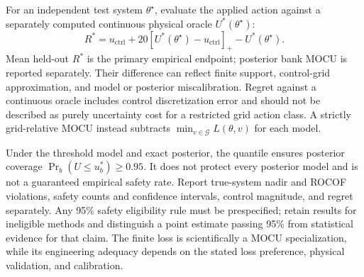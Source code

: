 For an independent test system $\theta^\star$, evaluate the applied action
against a separately computed continuous physical oracle $U^*(\theta^\star)$:
\begin{equation}
R^*=u_{\mathrm{ctrl}}+20[U^*(\theta^\star)-u_{\mathrm{ctrl}}]_+
-U^*(\theta^\star).
\label{eq:realized_regret}
\end{equation}
Mean held-out $R^*$ is the primary empirical endpoint; posterior bank MOCU
is reported separately. Their difference can reflect finite support,
control-grid approximation, and model or posterior miscalibration. Regret
against a continuous oracle includes control discretization error and should
not be described as purely uncertainty cost for a restricted grid action
class. A strictly grid-relative MOCU instead subtracts
$\min_{v\in\mathcal G}L(\theta,v)$ for each model.

Under the threshold model and exact posterior, the quantile ensures posterior
coverage $\Pr_b(U\le u_b^*)\ge0.95$. It does not protect every posterior
model and is not a guaranteed empirical safety rate. Report true-system
nadir and ROCOF violations, safety counts and confidence intervals, control
magnitude, and regret separately. Any 95\% safety eligibility rule must be
prespecified; retain results for ineligible methods and distinguish a point
estimate passing 95\% from statistical evidence for that claim. The finite
loss is scientifically a MOCU specialization, while its engineering adequacy
depends on the stated loss preference, physical validation, and calibration.

